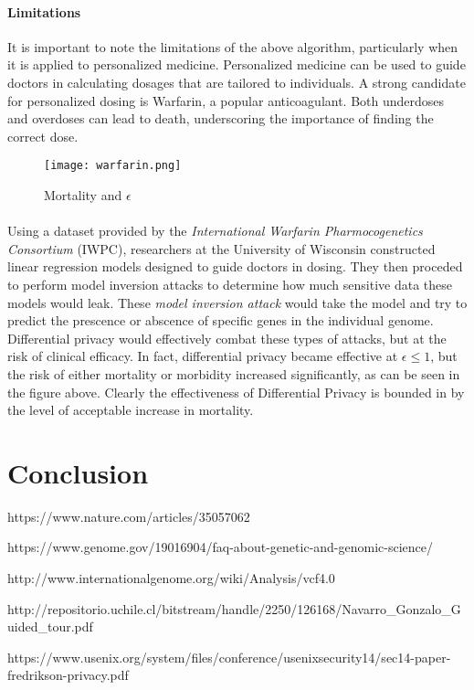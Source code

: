 \paragraph{Limitations}

It is important to note the limitations of the above algorithm, particularly when it is applied to personalized medicine. Personalized medicine can be used to guide doctors in calculating dosages that are tailored to individuals. A strong candidate for personalized dosing is Warfarin, a popular anticoagulant. Both underdoses and overdoses can lead to death, underscoring the importance of finding the correct dose.

\begin{center}
\begin{figure}[t!]
\texttt{[image: warfarin.png]}
\centering
\caption{Mortality and $\epsilon$}
\end{figure}
\end{center}

\paragraph{}
Using a dataset provided by the \textit{International Warfarin Pharmocogenetics Consortium} (IWPC), researchers at the University of Wisconsin constructed linear regression models designed to guide doctors in dosing. They then proceded to perform model inversion attacks to determine how much sensitive data these models would leak. These \textit{model inversion attack} would take the model and try to predict the prescence or abscence of specific genes in the individual genome. Differential privacy would effectively combat these types of attacks, but at the risk of clinical efficacy. In fact, differential privacy became effective at $\epsilon \leq 1$, but the risk of either mortality or morbidity increased significantly, as can be seen in the figure above. Clearly the effectiveness of Differential Privacy is bounded in by the level of acceptable increase in mortality. 

\section{Conclusion}

\begin{thebibliography}{5}
  
  https://www.nature.com/articles/35057062

  https://www.genome.gov/19016904/faq-about-genetic-and-genomic-science/

  http://www.internationalgenome.org/wiki/Analysis/vcf4.0
  
  http://repositorio.uchile.cl/bitstream\-/handle/2250/126168/Navarro\_Gonzalo\-\_Guided\_tour.pdf

  https://www.usenix.org/system/files/conference/usenixsecurity14/sec14-paper-fredrikson-privacy.pdf

\end{thebibliography}
